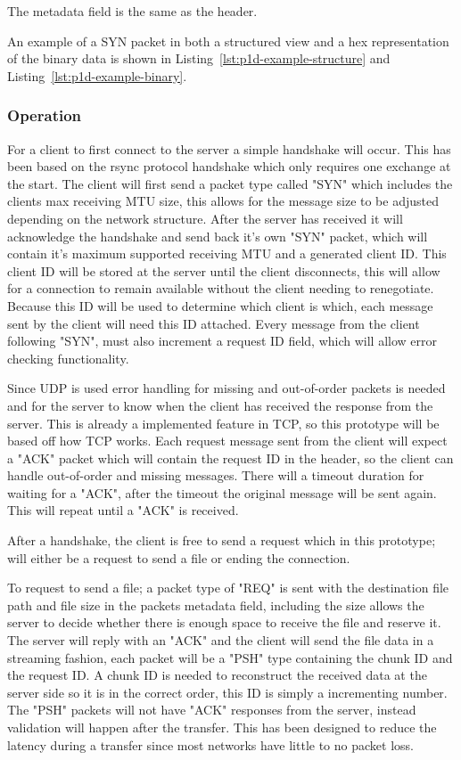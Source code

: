 The metadata field is the same as the header.

An example of a SYN packet in both a structured view and a hex representation of the binary data is shown in Listing~\ref{lst:p1d-example-structure} and Listing~\ref{lst:p1d-example-binary}.

\subsubsection*{Operation}
For a client to first connect to the server a simple handshake will occur. This has been based on the rsync protocol handshake which only requires one exchange at the start. The client will first send a packet type called "SYN" which includes the clients max receiving MTU size, this allows for the message size to be adjusted depending on the network structure. After the server has received it will acknowledge the handshake and send back it's own "SYN" packet, which will contain it's maximum supported receiving MTU and a generated client ID. This client ID will be stored at the server until the client disconnects, this will allow for a connection to remain available without the client needing to renegotiate. Because this ID will be used to determine which client is which, each message sent by the client will need this ID attached. Every message from the client following "SYN", must also increment a request ID field, which will allow error checking functionality.

Since UDP is used error handling for missing and out-of-order packets is needed and for the server to know when the client has received the response from the server. This is already a implemented feature in TCP, so this prototype will be based off how TCP works. Each request message sent from the client will expect a "ACK" packet which will contain the request ID in the header, so the client can handle out-of-order and missing messages. There will a timeout duration for waiting for a "ACK", after the timeout the original message will be sent again. This will repeat until a "ACK" is received.

After a handshake, the client is free to send a request which in this prototype; will either be a request to send a file or ending the connection.

To request to send a file; a packet type of "REQ" is sent with the destination file path and file size in the packets metadata field, including the size allows the server to decide whether there is enough space to receive the file and reserve it. The server will reply with an "ACK" and the client will send the file data in a streaming fashion, each packet will be a "PSH" type containing the chunk ID and the request ID. A chunk ID is needed to reconstruct the received data at the server side so it is in the correct order, this ID is simply a incrementing number. The "PSH" packets will not have "ACK" responses from the server, instead validation will happen after the transfer. This has been designed to reduce the latency during a transfer since most networks have little to no packet loss.

